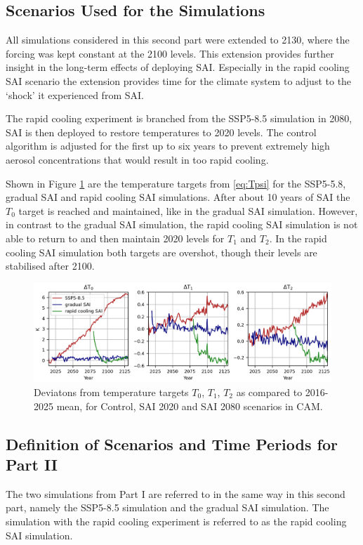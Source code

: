 \subsection{Scenarios Used for the Simulations}
All simulations considered in this second part were extended to 2130, where the forcing was kept constant at the 2100 levels. This extension provides further insight in the long-term effects of deploying SAI. Especially in the rapid cooling SAI scenario the extension provides time for the climate system to adjust to the `shock' it experienced from SAI. 

The rapid cooling experiment is branched from the SSP5-8.5 simulation in 2080, SAI is then deployed to restore temperatures to 2020 levels. The control algorithm is adjusted for the first up to six years to prevent extremely high aerosol concentrations that would result in too rapid cooling. 

Shown in Figure \ref{fig:Tgrad_ext} are the temperature targets from \ref{eq:Tpsi} for the SSP5-5.8, gradual SAI and rapid cooling SAI simulations. After about 10 years of SAI the $T_0$ target is reached and maintained, like in the gradual SAI simulation. However, in contrast to the gradual SAI simulation, the rapid cooling SAI simulation is not able to return to and then maintain 2020 levels for $T_1$ and $T_2$. In the rapid cooling SAI simulation both targets are overshot, though their levels are stabilised after 2100. 

\begin{figure}[h]
	\centering
	\includegraphics[width=\linewidth]{images/Tgrad_ext.png}
	\caption{Deviatons from temperature targets $T_0$, $T_1$, $T_2$ as compared to 2016-2025 mean, for Control, SAI 2020 and SAI 2080 scenarios in CAM.}
	\label{fig:Tgrad_ext}
\end{figure}


\subsection{Definition of Scenarios and Time Periods for Part II}
The two simulations from Part I are referred to in the same way in this second part, namely the SSP5-8.5 simulation and the gradual SAI simulation. The simulation with the rapid cooling experiment is referred to as the rapid cooling SAI simulation. 

